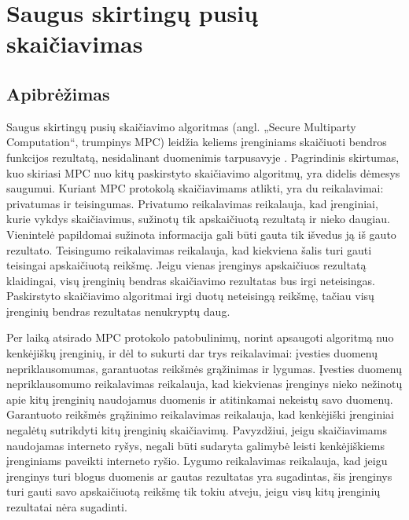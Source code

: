 \documentclass{VUMIFInfBakalaurinis}
\begin{document}
\section{Saugus skirtingų pusių skaičiavimas}
\subsection{Apibrėžimas}
\par Saugus skirtingų pusių skaičiavimo algoritmas (angl. „Secure Multiparty Computation“, trumpinys MPC) leidžia keliems įrenginiams skaičiuoti bendros funkcijos rezultatą, nesidalinant duomenimis tarpusavyje \cite{22}. Pagrindinis skirtumas, kuo  skiriasi MPC nuo kitų paskirstyto skaičiavimo algoritmų, yra didelis dėmesys saugumui. Kuriant MPC protokolą skaičiavimams atlikti, yra du reikalavimai: privatumas ir teisingumas. Privatumo reikalavimas reikalauja, kad įrenginiai, kurie vykdys skaičiavimus, sužinotų tik apskaičiuotą rezultatą ir nieko daugiau. Vienintelė papildomai sužinota informacija gali būti gauta tik išvedus ją iš gauto rezultato. Teisingumo reikalavimas reikalauja, kad kiekviena šalis turi gauti teisingai apskaičiuotą reikšmę. Jeigu vienas įrenginys apskaičiuos rezultatą klaidingai, visų įrenginių bendras skaičiavimo rezultatas bus irgi neteisingas. Paskirstyto skaičiavimo algoritmai irgi duotų neteisingą reikšmę, tačiau visų įrenginių bendras rezultatas nenukryptų daug.
\par Per laiką atsirado MPC protokolo patobulinimų, norint apsaugoti algoritmą nuo kenkėjiškų įrenginių, ir dėl to sukurti dar trys reikalavimai: įvesties duomenų nepriklausomumas, garantuotas reikšmės grąžinimas ir lygumas. Įvesties duomenų nepriklausomumo reikalavimas reikalauja, kad kiekvienas įrenginys nieko nežinotų apie kitų įrenginių naudojamus duomenis ir atitinkamai nekeistų savo duomenų. Garantuoto reikšmės grąžinimo reikalavimas reikalauja, kad kenkėjiški įrenginiai negalėtų sutrikdyti kitų įrenginių skaičiavimų. Pavyzdžiui, jeigu skaičiavimams naudojamas interneto ryšys, negali būti sudaryta galimybė leisti kenkėjiškiems įrenginiams paveikti interneto ryšio. Lygumo reikalavimas reikalauja, kad jeigu įrenginys turi blogus duomenis ar gautas rezultatas yra sugadintas, šis įrenginys turi gauti savo apskaičiuotą reikšmę tik tokiu atveju, jeigu visų kitų įrenginių rezultatai nėra sugadinti.
\end{document}
